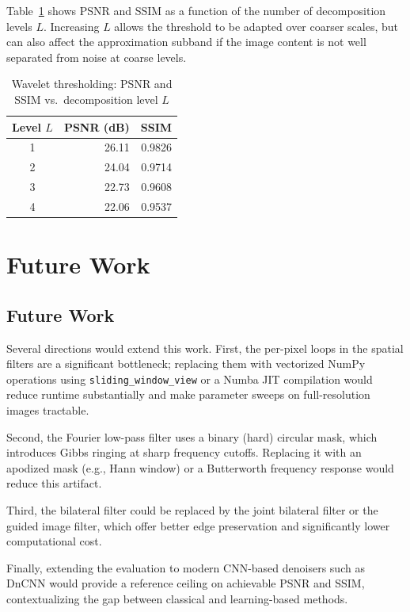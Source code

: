 \documentclass[conference]{IEEEtran}
\begin{document}
Table~\ref{tab:wavelet_sweep} shows PSNR and SSIM as a function of the number of decomposition levels $L$. Increasing $L$ allows the threshold to be adapted over coarser scales, but can also affect the approximation subband if the image content is not well separated from noise at coarse levels.

\begin{table}[H]
\centering
\caption{Wavelet thresholding: PSNR and SSIM vs.\ decomposition level $L$}
\label{tab:wavelet_sweep}
\begin{tabular}{crr}
\toprule
Level $L$ & PSNR (dB) & SSIM \\
\midrule
1          & 26.11      & 0.9826 \\
2          & 24.04      & 0.9714 \\ 
3          & 22.73      & 0.9608 \\
4          & 22.06      & 0.9537 \\
\bottomrule
\end{tabular}
\end{table}

\section{Future Work}

\subsection{Future Work}

Several directions would extend this work. First, the per-pixel loops in the spatial filters are a significant bottleneck; replacing them with vectorized NumPy operations using \texttt{sliding\_window\_view} or a Numba JIT compilation would reduce runtime substantially and make parameter sweeps on full-resolution images tractable.

Second, the Fourier low-pass filter uses a binary (hard) circular mask, which introduces Gibbs ringing at sharp frequency cutoffs. Replacing it with an apodized mask (e.g., Hann window) or a Butterworth frequency response would reduce this artifact.

Third, the bilateral filter could be replaced by the joint bilateral filter or the guided image filter, which offer better edge preservation and significantly lower computational cost.

Finally, extending the evaluation to modern CNN-based denoisers such as DnCNN would provide a reference ceiling on achievable PSNR and SSIM, contextualizing the gap between classical and learning-based methods.

\end{document}
